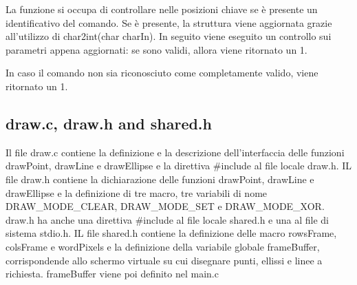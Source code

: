 \documentclass{article}
\begin{document}
			La funzione si occupa di controllare nelle posizioni chiave se è presente un identificativo del comando.
			Se è presente, la struttura viene aggiornata grazie all'utilizzo di char2int(char charIn).
			In seguito viene eseguito un controllo sui parametri appena aggiornati: se sono validi, allora viene
			ritornato un 1.

			In caso il comando non sia riconosciuto come completamente valido, viene ritornato un 1.
      \subsection{draw.c, draw.h and shared.h}
      Il file draw.c contiene la definizione e la descrizione dell'interfaccia delle funzioni drawPoint, drawLine e drawEllipse e la direttiva \#include al file locale draw.h.
      IL file draw.h contiene la dichiarazione delle funzioni drawPoint, drawLine e drawEllipse e la definizione di tre macro, tre variabili di nome DRAW\_MODE\_CLEAR, DRAW\_MODE\_SET e DRAW\_MODE\_XOR.
      draw.h ha anche una direttiva \#include al file locale shared.h e una al file di sistema stdio.h.
      IL file shared.h contiene la definizione delle macro rowsFrame, colsFrame e wordPixels e la definizione della variabile globale frameBuffer,
      corrispondende allo schermo virtuale su cui disegnare punti, ellissi e linee a richiesta. frameBuffer viene poi definito nel main.c
\end{document}
